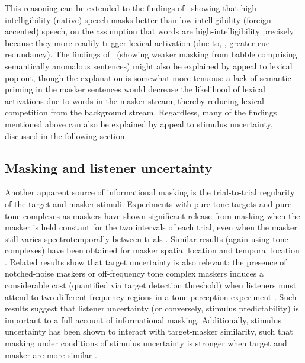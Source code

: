 This reasoning can be extended to the findings of \citeauthor{CalandruccioEtAl2010}\ showing that high intelligibility (native) speech masks better than low intelligibility (foreign-accented) speech, on the assumption that words are high-intelligibility precisely because they more readily trigger lexical activation (due to, \eg, greater cue redundancy).  The findings of \citeauthor{BrouwerEtAl2012}\ (showing weaker masking from babble comprising semantically anomalous sentences) might also be explained by appeal to lexical pop-out, though the explanation is somewhat more tenuous: a lack of semantic priming in the masker sentences would decrease the likelihood of lexical activations due to words in the masker stream, thereby reducing lexical competition from the background stream.  Regardless, many of the findings mentioned above can also be explained by appeal to stimulus uncertainty, discussed in the following section. %

\subsection{Masking and listener uncertainty\label{sec:uncertainty}}
Another apparent source of informational masking is the trial-to-trial regularity of the target and masker stimuli.  Experiments with pure-tone targets and pure-tone complexes as maskers have shown significant release from masking when the masker is held constant for the two intervals of each trial, even when the masker still varies spectrotemporally between trials \citep{NeffGreen1987, NeffCallahan1988}.  Similar results (again using tone complexes) have been obtained for masker spatial location \citep{FanEtAl2008} and temporal location \citep{BoninoLeibold2008}.  Related results show that target uncertainty is also relevant: the presence of notched-noise maskers or off-frequency tone complex maskers induces a considerable cost (quantified via target detection threshold) when listeners must attend to two different frequency regions in a tone-perception experiment \citep{KiddEtAl2008}.  Such results suggest that listener uncertainty (or conversely, stimulus predictability) is important to a full account of informational masking.  Additionally, stimulus uncertainty has been shown to interact with target-masker similarity, such that masking under conditions of stimulus uncertainty is stronger when target and masker are more similar \citep{DurlachEtAl2003b}.

